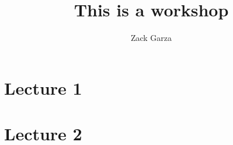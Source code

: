 \documentclass{memoir}
\title{This is a workshop}
\author{Zack Garza}
\begin{document}
\maketitle

\section{Lecture 1}


\section{Lecture 2}

\end{document}
